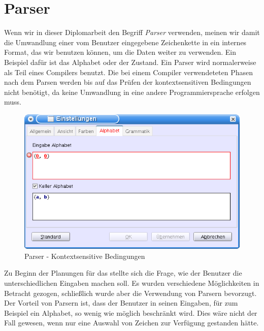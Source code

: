 \section{Parser}\label{Parser}

Wenn wir in dieser Diplomarbeit den Begriff {\em Parser} verwenden, meinen wir
damit die Umwandlung einer vom Benutzer eingegebene Zeichenkette in ein internes
Format, das wir benutzen können, um die Daten weiter zu verwenden. Ein Beispiel
dafür ist das Alphabet oder der Zustand. Ein Parser wird normalerweise als Teil
eines Compilers benutzt. Die bei einem Compiler verwendeteten Phasen nach dem
Parsen werden bis auf das Prüfen der kontextsensitiven Bedingungen nicht
benötigt, da keine Umwandlung in eine andere Programmiersprache erfolgen
muss.\vspace{10pt}

\begin{figure}[h!]
\begin{center}
\includegraphics[width=12cm]{../images/parser.png}
\caption{Parser - Kontextsensitive Bedingungen}
\label{FigureParser}
\end{center}
\end{figure}
\vspace{10pt}

Zu Beginn der Planungen für das \gtitool stellte sich die Frage, wie der Benutzer
die unterschiedlichen Eingaben machen soll. Es wurden verschiedene
Möglichkeiten in Betracht gezogen, schließlich wurde aber die Verwendung von
Parsern bevorzugt. Der Vorteil von Parsern ist, dass der Benutzer in seinen
Eingaben, für zum Beispiel ein Alphabet, so wenig wie möglich beschränkt wird.
Dies wäre nicht der Fall gewesen, wenn nur eine Auswahl von Zeichen zur
Verfügung gestanden hätte.\vspace{10pt}

